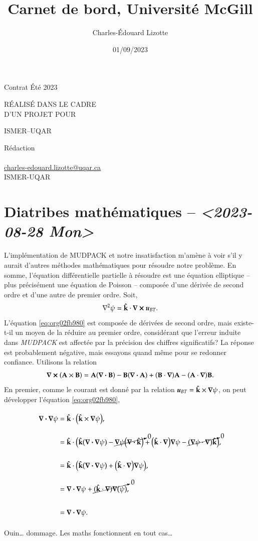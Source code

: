 \documentclass[10pt]{article}
\author{Charles-Édouard Lizotte}
\date{01/09/2023}
\title{Carnet de bord, Université McGill}
\makeatletter
\numberwithin{equation}{section}
\newcommand{\kvf}{\vb{\hat{k}}}
\newcommand{\uu}{\vb*{u}}
\newcommand{\venti}{\vphantom{\sum_x^x}}
\newcommand{\mytitlepage}{
\begin{titlepage}
\begin{center}
{\Large Contrat Été 2023 \par}
\vspace{2cm}
{\Large \MakeUppercase{\thetitle} \par}
\vspace{2cm}
RÉALISÉ DANS LE CADRE\\ D'UN PROJET POUR \par
\vspace{2cm}
{\Large ISMER--UQAR \par}
\vspace{2cm}
{\thedate}
\end{center}
\vfill
Rédaction \\
{\theauthor}\\
\url{charles-edouard.lizotte@uqar.ca}\\
ISMER-UQAR
\end{titlepage}
}
\makeatother
\begin{document}
\mytitlepage
\tableofcontents\newpage

\section{Diatribes mathématiques -- \textit{<2023-08-28 Mon>}}
\label{sec:org91e80ff}
L'implémentation de MUDPACK et notre insatisfaction m'amène à voir s'il y aurait d'autres méthodes mathématiques pour résoudre notre problème.
En somme, l'équation différentielle partielle à résoudre est une équation elliptique -- plus précisément une équation de Poisson -- composée d'une dérivée de second ordre et d'une autre de premier ordre.
Soit,
\begin{equation}
\label{eq:org02fb980}
   \laplacian{\psi} = \kvf \cdot \curl{\uu_{BT}}.
\end{equation}
L'équation \ref{eq:org02fb980} est composée de dérivées de second ordre, mais existe-t-il un moyen de la réduire au premier ordre, considérant que l'erreur induite dans \emph{MUDPACK} est affectée par la précision des chiffres significatifs?
La réponse est probablement négative, mais essayons quand même pour se redonner confiance.
Utilisons la relation
\begin{equation}
   \curl(\vb{A}\times\vb{B}) = \vb{A}\qty(\divergence{\vb{B}}) - \vb{B}\qty(\divergence{\vb{A}}) +\qty(\vb{B}\cdot\gradient)\vb{A} -\qty(\vb{A}\cdot\gradient)\vb{B}.
\end{equation}
En premier, comme le courant est donné par la relation \(\uu_{BT} = \kvf \times \gradient{\psi}\), on peut développer l'équation \ref{eq:org02fb980},
\begin{align}
   \div{\gradient{\psi}}
   \venti&= \kvf \cdot \qty(\kvf \times \gradient{\psi}),\nonumber \\
   \venti&= \kvf \cdot \big(\kvf\qty(\divergence{\gradient{\psi}}) - \cancelto{0}{\gradient{\psi}\qty(\divergence{\kvf})} + \qty(\kvf\cdot\gradient) \gradient{\psi} - \cancelto{0}{\qty(\gradient{\psi} \cdot\gradient)\kvf} \big),\nonumber\\
   \venti&= \kvf \cdot \qty(\kvf\qty(\divergence{\gradient{\psi}}) + \qty(\kvf\cdot\gradient) \gradient{\psi}),\nonumber\\
   \venti&= \divergence{\gradient{\psi}} + \cancelto{0}{(\kvf\cdot\gradient)\gradient(\psi)},\nonumber\\
   \venti&=\divergence{\gradient{\psi}}.
\end{align}
Ouin\ldots{} dommage. Les maths fonctionnent en tout cas\ldots{}
\end{document}
